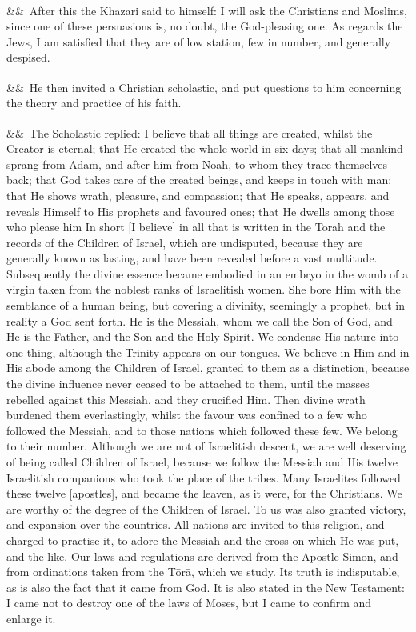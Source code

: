 \documentclass[12pt]{article}
\newcommand{\para}[1][]{\par\noindent\ifx&#1&\else\textsuperscript{\footnotesize #1}~\fi}
\begin{document}
\para After this the Khazari said to himself: I will ask the Christians and Moslims, since one of these persuasions is, no doubt, the God-pleasing one. As regards the Jews, I am satisfied that they are of low station, few in number, and generally despised.

\para He then invited a Christian scholastic, and put questions to him concerning the theory and practice of his faith.

\para The Scholastic replied: I believe that all things are created, whilst the Creator is eternal; that He created the whole world in six days; that all mankind sprang from Adam, and after him from Noah, to whom they trace themselves back; that God takes care of the created beings, and keeps in touch with man; that He shows wrath, pleasure, and compassion; that He speaks, appears, and reveals Himself to His prophets and favoured ones; that He dwells among those who please him In short [I believe] in all that is written in the Torah and the records of the Children of Israel, which are undisputed, because they are generally known as lasting, and have been revealed before a vast multitude. Subsequently the divine essence became embodied in an embryo in the womb of a virgin taken from the noblest ranks of Israelitish women. She bore Him with the semblance of a human being, but covering a divinity, seemingly a prophet, but in reality a God sent forth. He is the Messiah, whom we call the Son of God, and He is the Father, and the Son and the Holy Spirit. We condense His nature into one thing, although the Trinity appears on our tongues. We believe in Him and in His abode among the Children of Israel, granted to them as a distinction, because the divine influence never ceased to be attached to them, until the masses rebelled against this Messiah, and they crucified Him. Then divine wrath burdened them everlastingly, whilst the favour was confined to a few who followed the Messiah, and to those nations which followed these few. We belong to their number. Although we are not of Israelitish descent, we are well deserving of being called Children of Israel, because we follow the Messiah and His twelve Israelitish companions who took the place of the tribes. Many Israelites followed these twelve [apostles], and became the leaven, as it were, for the Christians. We are worthy of the degree of the Children of Israel. To us was also granted victory, and expansion over the countries. All nations are invited to this religion, and charged to practise it, to adore the Messiah and the cross on which He was put, and the like. Our laws and regulations are derived from the Apostle Simon, and from ordinations taken from the Tōrā, which we study. Its truth is indisputable, as is also the fact that it came from God. It is also stated in the New Testament: I came not to destroy one of the laws of Moses, but I came to confirm and enlarge it.
\end{document}
